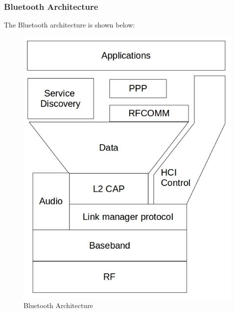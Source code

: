 \subsubsection{Bluetooth Architecture}
The Bluetooth architecture\cite{bluetooth2} is shown below:
\begin{figure}[htp]
\center
\includegraphics[scale=0.5]{bluetootharchitecturenew.jpg}  
\caption{Bluetooth Architecture}
\end{figure}
